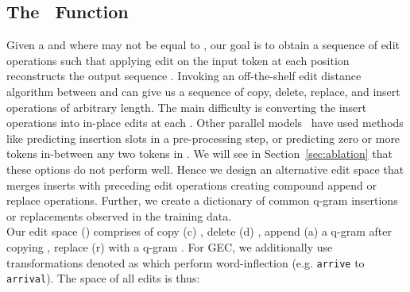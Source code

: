 \documentclass[11pt,a4paper]{article}
\newcommand{\cpy}{\mbox{\sc c}}
\newcommand{\app}{\mbox{\sc a}}
\newcommand{\delete}{\mbox{\sc d}}
\newcommand{\replace}{\mbox{\sc r}}
\newcommand{\editF}{{\text{Seq2Edits}}}
\begin{document}
\subsection{The  \editF\ Function}
\label{sec:editseq}
Given a  and  where  may not be equal to ,
our goal is to obtain a sequence of edit operations  such that applying edit  on the input token  at each position  reconstructs the output sequence .
Invoking an off-the-shelf edit distance algorithm between  and  can give us a sequence of copy, delete, replace, and insert operations of arbitrary length.  The main difficulty is converting the insert operations into in-place edits at each . Other parallel models~\cite{Ribeiro2018,Lee2018} have used methods like predicting insertion slots in a pre-processing step, or predicting zero or more tokens in-between any two tokens in .  We will see in Section~\ref{sec:ablation} that these options do not perform well.  Hence we design an alternative edit space  that merges inserts with preceding edit operations creating compound append or replace operations.
Further, we create a  dictionary  of common q-gram insertions or replacements observed in the training data.\\
Our edit space () comprises of copy (\cpy) , delete (\delete) , append (\app) a  q-gram  after copying , replace (\replace)  with a q-gram . For GEC, we additionally use transformations denoted as  which perform word-inflection (e.g. {\tt arrive} to {\tt arrival}).
The space of all edits is thus:
\end{document}

